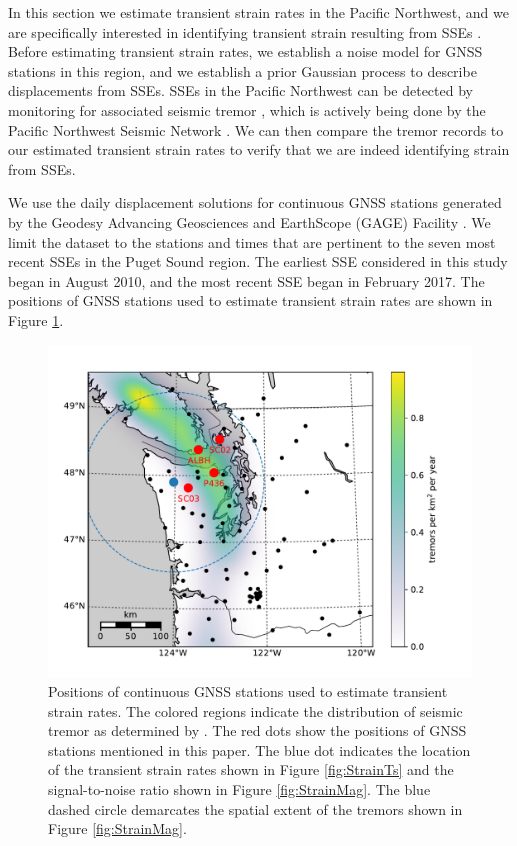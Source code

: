 \documentclass[extra,mreferee]{gji}
\begin{document}

In this section we estimate transient strain rates in the Pacific
Northwest, and we are specifically interested in identifying transient
strain resulting from SSEs \citep[e.g.,][]{Dragert2001}. Before
estimating transient strain rates, we establish a noise model for GNSS
stations in this region, and we establish a prior Gaussian process to
describe displacements from SSEs. SSEs in the Pacific Northwest can be
detected by monitoring for associated seismic tremor
\citep{Rogers2003}, which is actively being done by the Pacific
Northwest Seismic Network \citep{Wech2010}. We can then compare the
tremor records to our estimated transient strain rates to verify that
we are indeed identifying strain from SSEs.


We use the daily displacement solutions for continuous GNSS stations
generated by the Geodesy Advancing Geosciences and EarthScope (GAGE)
Facility \citep{Herring2016}. We limit the dataset to the stations and
times that are pertinent to the seven most recent SSEs in the Puget
Sound region. The earliest SSE considered in this study began in
August 2010, and the most recent SSE began in February 2017. The
positions of GNSS stations used to estimate transient strain rates are
shown in Figure \ref{fig:Context}.

\begin{figure}
\includegraphics{figures/context_map/context-map.pdf}
\caption{
Positions of continuous GNSS stations used to estimate transient
strain rates. The colored regions indicate the distribution of seismic
tremor as determined by \citet{Wech2010}. The red dots show the
positions of GNSS stations mentioned in this paper. The blue dot
indicates the location of the transient strain rates shown in Figure
\ref{fig:StrainTs} and the signal-to-noise ratio shown in Figure
\ref{fig:StrainMag}. The blue dashed circle demarcates the spatial
extent of the tremors shown in Figure \ref{fig:StrainMag}.
}    
\label{fig:Context}
\end{figure}
\end{document}
